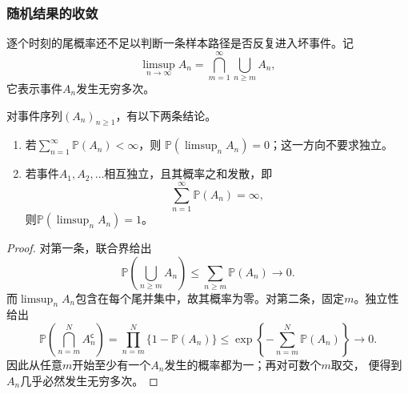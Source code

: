 \subsubsection{随机结果的收敛}
\label{sec:rv-numerical-convergence}
逐个时刻的尾概率还不足以判断一条样本路径是否反复进入坏事件。记
\[
  \limsup_{n\to\infty}A_n
  =
  \bigcap_{m=1}^{\infty}\bigcup_{n\geq m}A_n,
\]
它表示事件\(A_n\)发生无穷多次。
\begin{theorem}
  \label{thm:probability-borel-cantelli}
  对事件序列\((A_n)_{n\geq1}\)，有以下两条结论。
  \begin{enumerate}
    \item 若\(\sum_{n=1}^{\infty}\mathbb{P}(A_n)<\infty\)，则
    \(\mathbb{P}(\limsup_n A_n)=0\)；这一方向不要求独立。
    \item 若事件\(A_1,A_2,\ldots\)相互独立，且其概率之和发散，即
    \[
      \sum_{n=1}^{\infty}\mathbb{P}(A_n)=\infty,
    \]
    则\(\mathbb{P}(\limsup_n A_n)=1\)。
  \end{enumerate}
\end{theorem}

\begin{proof}
对第一条，联合界给出
\[
  \mathbb{P}\left(\bigcup_{n\geq m}A_n\right)
  \leq\sum_{n\geq m}\mathbb{P}(A_n)\longrightarrow0.
\]
而\(\limsup_n A_n\)包含在每个尾并集中，故其概率为零。对第二条，固定\(m\)。独立性
给出
\[
  \mathbb{P}\left(\bigcap_{n=m}^{N}A_n^{\mathsf c}\right)
  =
  \prod_{n=m}^{N}\{1-\mathbb{P}(A_n)\}
  \leq
  \exp\left\{-\sum_{n=m}^{N}\mathbb{P}(A_n)\right\}
  \longrightarrow0.
\]
因此从任意\(m\)开始至少有一个\(A_n\)发生的概率都为一；再对可数个\(m\)取交，
便得到\(A_n\)几乎必然发生无穷多次。
\end{proof}


